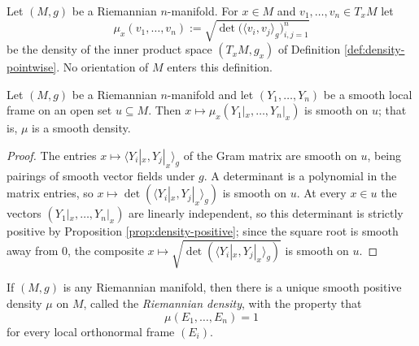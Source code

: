 \begin{definition}
\label{def:riemannian-density-pointwise}
\leanok
{}
Let $(M,g)$ be a Riemannian $n$-manifold. For $x \in M$ and $v_1, \ldots, v_n \in T_x M$ let
\[
\mu_x(v_1, \ldots, v_n) := \sqrt{\det \bigl( \langle v_i, v_j \rangle_g \bigr)_{i,j=1}^{n}}
\]
be the density of the inner product space $(T_x M, g_x)$ of Definition
\ref{def:density-pointwise}. No orientation of $M$ enters this definition.
\end{definition}

\begin{proposition}
\label{prop:density-smooth}
\leanok
{}
Let $(M,g)$ be a Riemannian $n$-manifold and let $(Y_1, \ldots, Y_n)$ be a smooth local frame on
an open set $u \subseteq M$. Then $x \mapsto \mu_x(Y_1|_x, \ldots, Y_n|_x)$ is smooth on $u$; that
is, $\mu$ is a smooth density.
\end{proposition}

\begin{proof}
\leanok
{}
The entries $x \mapsto \langle Y_i|_x, Y_j|_x \rangle_g$ of the Gram matrix are smooth on $u$,
being pairings of smooth vector fields under $g$. A determinant is a polynomial in the matrix
entries, so $x \mapsto \det (\langle Y_i|_x, Y_j|_x \rangle_g)$ is smooth on $u$. At every $x \in u$
the vectors $(Y_1|_x, \ldots, Y_n|_x)$ are linearly independent, so this determinant is strictly
positive by Proposition \ref{prop:density-positive}; since the square root is smooth away from
$0$, the composite $x \mapsto \sqrt{\det (\langle Y_i|_x, Y_j|_x \rangle_g)}$ is smooth on $u$.
\end{proof}

\begin{proposition}\label{prop:riemannian-density}
\leanok
{}
If $(M,g)$ is any Riemannian manifold, then there is a unique smooth positive density $\mu$ on $M$, called the \emph{Riemannian density}, with the property that
\begin{equation}
\mu(E_1,\ldots,E_n) = 1 \tag{2.18}
\end{equation}
for every local orthonormal frame $(E_i)$.
\end{proposition}

